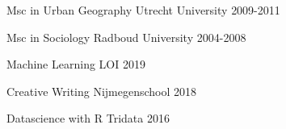 



\begin{cvhonors}

  \cvhonor
    {Msc in Urban Geography} %
    {} %
    {Utrecht University} %
    {2009-2011} %

  \cvhonor
    {Msc in Sociology} %
    {} %
    {Radboud University} %
    {2004-2008} %

\end{cvhonors}




\begin{cvhonors}

  \cvhonor
    {Machine Learning} %
    {} %
    {LOI} %
    {2019} %

  \cvhonor
    {Creative Writing} %
    {} %
    {Nijmegenschool} %
    {2018} %

  \cvhonor
    {Datascience with R} %
    {} %
    {Tridata} %
    {2016} %

\end{cvhonors}
